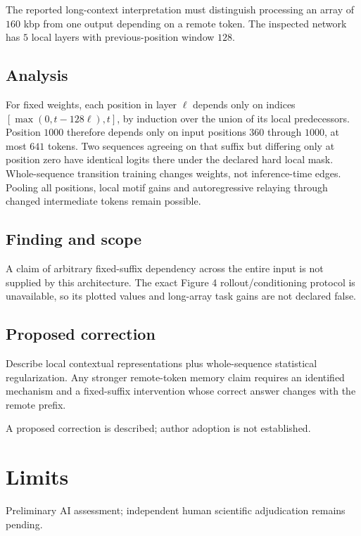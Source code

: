 \documentclass[11pt]{article}
\begin{document}
The reported long-context interpretation must distinguish processing an array of \(160\) kbp from one output depending on a remote token. The inspected network has \(5\) local layers with previous-position window \(128\).

\subsection*{Analysis}

For fixed weights, each position in layer \(\ell\) depends only on indices \([\max(0,t-128\ell),t]\), by induction over the union of its local predecessors. Position \(1000\) therefore depends only on input positions \(360\) through \(1000\), at most \(641\) tokens. Two sequences agreeing on that suffix but differing only at position zero have identical logits there under the declared hard local mask. Whole-sequence transition training changes weights, not inference-time edges. Pooling all positions, local motif gains and autoregressive relaying through changed intermediate tokens remain possible.

\subsection*{Finding and scope}

A claim of arbitrary fixed-suffix dependency across the entire input is not supplied by this architecture. The exact Figure 4 rollout/conditioning protocol is unavailable, so its plotted values and long-array task gains are not declared false.

\subsection*{Proposed correction}

Describe local contextual representations plus whole-sequence statistical regularization. Any stronger remote-token memory claim requires an identified mechanism and a fixed-suffix intervention whose correct answer changes with the remote prefix.

A proposed correction is described; author adoption is not established.

\section*{Limits}

Preliminary AI assessment; independent human scientific adjudication remains pending.\par
\end{document}
